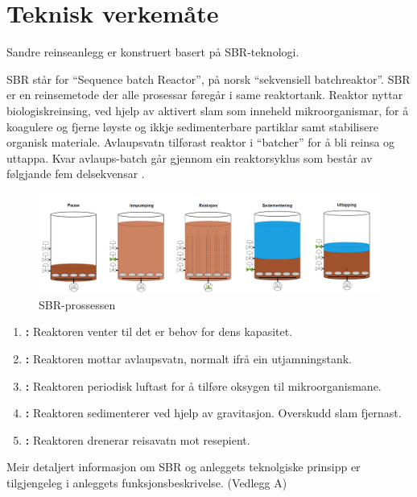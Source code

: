 \newpage
\section{Teknisk verkemåte}
\thispagestyle{fancy}
Sandre reinseanlegg er konstruert basert på \gls{SBR}-teknologi.

\gls{SBR} står for ``Sequence \Gls{batch} Reactor'', på norsk ``sekvensiell \gls{batch}reaktor''.\newline
\gls{SBR} er en reinsemetode der alle prosessar føregår i same reaktortank. 
Reaktor nyttar biologiskreinsing, ved hjelp av aktivert slam som inneheld mikroorganismar, for å koagulere 
og fjerne løyste og ikkje sedimenterbare partiklar samt stabilisere organisk materiale. 
Avlaupsvatn tilførast reaktor i ``batcher'' for å bli reinsa og uttappa. 
Kvar avlaups-batch går gjennom ein reaktorsyklus som består av følgjande fem delsekvensar \citep{Statsforvalter}.
\newline

\begin{figure}[htbp]
    \centering
    \includegraphics[width=1\textwidth]{Figurar/SBR-V2.png}
    \caption{\gls{SBR}-prossessen}\label{fig:SBR-Prosessen}
\end{figure}


\begin{enumerate}
    \item \textbf{:} Reaktoren venter til det er behov for dens kapasitet.
    \item \textbf{:} Reaktoren mottar avlaupsvatn, normalt ifrå ein utjamningstank.
    \item \textbf{:} Reaktoren periodisk luftast for å tilføre oksygen til mikroorganismane.
    \item \textbf{:} Reaktoren sedimenterer ved hjelp av gravitasjon. Overskudd slam fjernast.
    \item \textbf{:} Reaktoren drenerar reisavatn mot resepient.
\end{enumerate}

Meir detaljert informasjon om \gls{SBR} og anleggets teknolgiske prinsipp er tilgjengeleg i anleggets
funksjonsbeskrivelse. (Vedlegg A)

